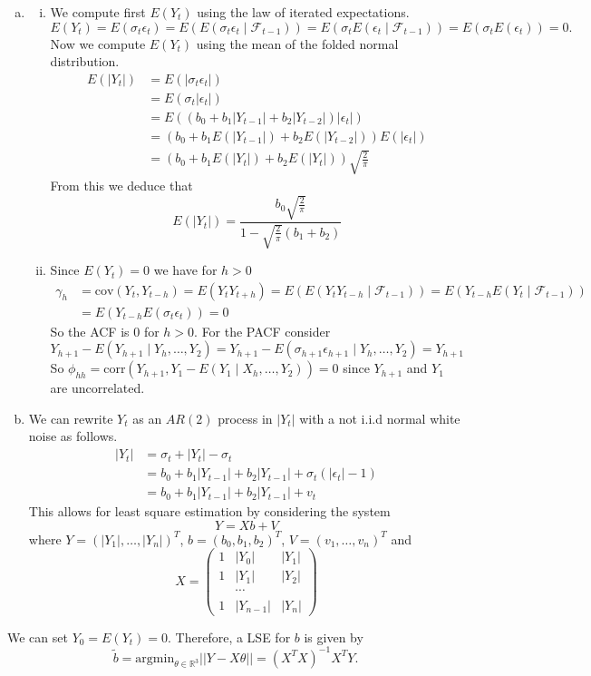 \documentclass{article}
\theoremstyle{plain}
\theoremstyle{definition}
\newenvironment{exercise}[1]
  {\renewcommand\theexerciseaux{#1}\exerciseaux\label{ejer:#1}}
  {\endexerciseaux}
\newenvironment{sol}{\begin{trivlist}
 \item[\hskip \labelsep {\textit{Solution}.}\hskip \labelsep]}{\end{trivlist}}
\newcommand{\R}{\mathbb{R}}
\begin{document}
\begin{exercise}{2}
\end{exercise}
\begin{sol}
\begin{enumerate}[(a)]
\item
\begin{enumerate}[(i)]
\item We compute first $E(Y_t)$ using the law of iterated expectations.
\[
E(Y_t)=E(\sigma_t\epsilon_t)= E(E(\sigma_t\epsilon_t\mid \mathcal{F}_{t-1}))=E(\sigma_tE(\epsilon_t\mid \mathcal{F}_{t-1}))=E(\sigma_tE(\epsilon_t))=0.
\]
Now we compute $E(Y_t)$ using the mean of the folded normal distribution.
\begin{align*}
E(|Y_t|)&= E(|\sigma_t\epsilon_t|)\\
& = E(\sigma_t|\epsilon_t|)\\
&=E((b_0+b_1|Y_{t-1}|+b_2|Y_{t-2}|)|\epsilon_t|)\\
&=(b_0+b_1E(|Y_{t-1}|)+b_2E(|Y_{t-2}|))E(|\epsilon_t|)\\
&=(b_0+b_1E(|Y_t|)+b_2E(|Y_{t}|))\sqrt{\frac{2}{\pi}}
\end{align*}
From this we deduce that
\[
E(|Y_t|)=\frac{b_0\sqrt{\frac{2}{\pi}}}{1-\sqrt{\frac{2}{\pi}}(b_1+b_2)}
\]
\item Since $E(Y_t)=0$ we have for $h>0$
\begin{align*}
\gamma_h & = \mathrm{cov}(Y_t, Y_{t-h})=E(Y_tY_{t+h})=E(E(Y_tY_{t-h}\mid \mathcal{F}_{t-1}))=E(Y_{t-h}E(Y_t\mid\mathcal{F}_{t-1}))\\
& = E(Y_{t-h}E(\sigma_t\epsilon_t))=0
\end{align*}
So the ACF is 0 for $h>0$. For the PACF consider
\[
Y_{h+1}- E(Y_{h+1}\mid Y_h,\dots, Y_2)=Y_{h+1}-E(\sigma_{h+1}\epsilon_{h+1}\mid Y_h,\dots, Y_2)=Y_{h+1}
\]
So $\phi_{hh}=\mathrm{corr}(Y_{h+1},Y_1-E(Y_1\mid X_h,\dots, Y_2))=0$ since $Y_{h+1}$ and $Y_1$ are uncorrelated.
\end{enumerate}
\item We can rewrite $Y_t$ as an $AR(2)$ process in $|Y_t|$ with a not i.i.d normal white noise as follows.
\begin{align*}
|Y_t| & = \sigma_t + |Y_t|-\sigma_t\\
& = b_0+b_1|Y_{t-1}| + b_2|Y_{t-1}| + \sigma_t(|\epsilon_t|-1)\\
& = b_0+b_1|Y_{t-1}| + b_2|Y_{t-1}|+v_t
\end{align*}
This allows for least square estimation by considering the system
\[Y=Xb+V\]
where $Y=(|Y_1|,\dots, |Y_n|)^T$, $b = (b_0,b_1,b_2)^T$, $V=(v_1,\dots, v_n)^T$ and
\[
X = \begin{pmatrix}
1 & |Y_0| & |Y_1|\\
1 & |Y_1| & |Y_2|\\
 & \cdots & \\
1 & |Y_{n-1}| & |Y_n| 
\end{pmatrix}
\]
\end{enumerate}
We can set $Y_0 = E(Y_t)=0$. Therefore, a LSE for $b$ is given by 
\[\tilde{b} = \mathrm{argmin}_{\theta\in\R^3}||Y-X\theta|| = (X^TX)^{-1}X^T Y.\]


\end{sol}
\end{document}
